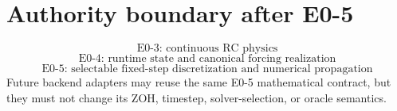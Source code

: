 \documentclass[11pt]{article}
\begin{document}
\section{Authority boundary after E0-5}
\[
\boxed{\text{E0-3: continuous RC physics}}
\]
\[
\boxed{\text{E0-4: runtime state and canonical forcing realization}}
\]
\[
\boxed{\text{E0-5: selectable fixed-step discretization and numerical propagation}}
\]
Future backend adapters may reuse the same E0-5 mathematical contract, but they
must not change its ZOH, timestep, solver-selection, or oracle semantics.



\end{document}

